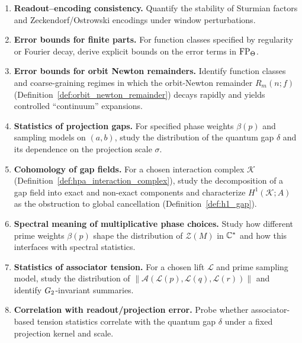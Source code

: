 \begin{enumerate}
    \item \textbf{Readout--encoding consistency.} Quantify the stability of Sturmian factors and Zeckendorf/Ostrowski encodings under window perturbations.
    \item \textbf{Error bounds for finite parts.} For function classes specified by regularity or Fourier decay, derive explicit bounds on the error terms in $\mathrm{FP}_\Theta$.
    \item \textbf{Error bounds for orbit Newton remainders.} Identify function classes and coarse-graining regimes in which the orbit-Newton remainder $R_m(n;f)$ (Definition~\ref{def:orbit_newton_remainder}) decays rapidly and yields controlled ``continuum'' expansions.
    \item \textbf{Statistics of projection gaps.} For specified phase weights $\beta(p)$ and sampling models on $(a,b)$, study the distribution of the quantum gap $\delta$ and its dependence on the projection scale $\sigma$.
    \item \textbf{Cohomology of gap fields.} For a chosen interaction complex $\mathcal{K}$ (Definition~\ref{def:hpa_interaction_complex}), study the decomposition of a gap field into exact and non-exact components and characterize $H^1(\mathcal{K};A)$ as the obstruction to global cancellation (Definition~\ref{def:h1_gap}).
    \item \textbf{Spectral meaning of multiplicative phase choices.} Study how different prime weights $\beta(p)$ shape the distribution of $\mathcal{Z}(M)$ in $\mathbb{C}^*$ and how this interfaces with spectral statistics.
    \item \textbf{Statistics of associator tension.} For a chosen lift $\mathcal{L}$ and prime sampling model, study the distribution of
    $
    \|\mathcal{A}(\mathcal{L}(p),\mathcal{L}(q),\mathcal{L}(r))\|
    $
    and identify $G_2$-invariant summaries.
    \item \textbf{Correlation with readout/projection error.} Probe whether associator-based tension statistics correlate with the quantum gap $\delta$ under a fixed projection kernel and scale.
\end{enumerate}

